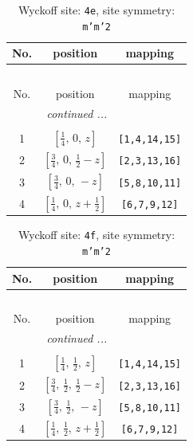 \documentclass[fleqn,8pt]{jsarticle}
\begin{document}
\renewcommand{\arraystretch}{1.2}
\begin{longtable}{ccc}
\caption{Wyckoff site: {\tt 4e}, site symmetry: {\tt m'm'2}}
 \\
 \hline \hline
No. & position & mapping \\ \hline \endfirsthead

\multicolumn{2}{l}{\tablename\ \thetable{}} \\
 \hline \hline
No. & position & mapping \\ \hline \endhead

 \hline \hline
\multicolumn{2}{r}{\footnotesize\it continued ...} \\ \endfoot

 \hline \hline
\multicolumn{2}{r}{} \\ \endlastfoot

1 & $\left[ \frac{1}{4},\, 0,\, z \right]$ & {\tt [1,4,14,15]} \\ \hline
2 & $\left[ \frac{3}{4},\, 0,\, \frac{1}{2} - z \right]$ & {\tt [2,3,13,16]} \\ \hline
3 & $\left[ \frac{3}{4},\, 0,\, - z \right]$ & {\tt [5,8,10,11]} \\ \hline
4 & $\left[ \frac{1}{4},\, 0,\, z + \frac{1}{2} \right]$ & {\tt [6,7,9,12]} \\
\end{longtable}
\renewcommand{\arraystretch}{1.2}
\begin{longtable}{ccc}
\caption{Wyckoff site: {\tt 4f}, site symmetry: {\tt m'm'2}}
 \\
 \hline \hline
No. & position & mapping \\ \hline \endfirsthead

\multicolumn{2}{l}{\tablename\ \thetable{}} \\
 \hline \hline
No. & position & mapping \\ \hline \endhead

 \hline \hline
\multicolumn{2}{r}{\footnotesize\it continued ...} \\ \endfoot

 \hline \hline
\multicolumn{2}{r}{} \\ \endlastfoot

1 & $\left[ \frac{1}{4},\, \frac{1}{2},\, z \right]$ & {\tt [1,4,14,15]} \\ \hline
2 & $\left[ \frac{3}{4},\, \frac{1}{2},\, \frac{1}{2} - z \right]$ & {\tt [2,3,13,16]} \\ \hline
3 & $\left[ \frac{3}{4},\, \frac{1}{2},\, - z \right]$ & {\tt [5,8,10,11]} \\ \hline
4 & $\left[ \frac{1}{4},\, \frac{1}{2},\, z + \frac{1}{2} \right]$ & {\tt [6,7,9,12]} \\
\end{longtable}
\end{document}
